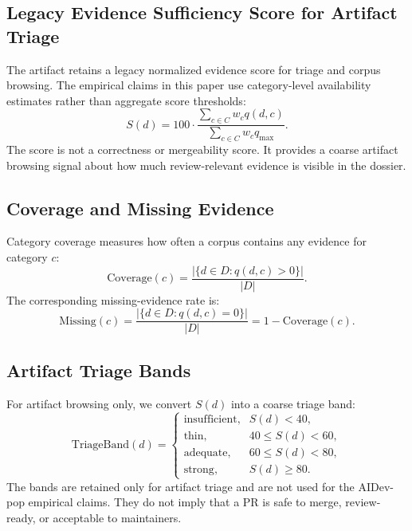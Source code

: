 \documentclass[10pt,conference]{IEEEtran}
\begin{document}
\subsection{Legacy Evidence Sufficiency Score for Artifact Triage}

The artifact retains a legacy normalized evidence score for triage and corpus browsing.
The empirical claims in this paper use category-level availability estimates rather than aggregate score thresholds:
\begin{equation}
S(d)=100 \cdot \frac{\sum_{c \in C} w_c q(d,c)}
{\sum_{c \in C} w_c q_{\max}}.
\end{equation}
The score is not a correctness or mergeability score.
It provides a coarse artifact browsing signal about how much review-relevant evidence is visible in the dossier.

\subsection{Coverage and Missing Evidence}

Category coverage measures how often a corpus contains any evidence for category $c$:
\begin{equation}
\mathrm{Coverage}(c)=
\frac{|\{d \in D : q(d,c)>0\}|}{|D|}.
\end{equation}
The corresponding missing-evidence rate is:
\begin{equation}
\mathrm{Missing}(c)=
\frac{|\{d \in D : q(d,c)=0\}|}{|D|}
=1-\mathrm{Coverage}(c).
\end{equation}

\subsection{Artifact Triage Bands}

For artifact browsing only, we convert $S(d)$ into a coarse triage band:
\begin{equation}
\mathrm{TriageBand}(d)=
\begin{cases}
\text{insufficient}, & S(d)<40,\\
\text{thin}, & 40 \le S(d)<60,\\
\text{adequate}, & 60 \le S(d)<80,\\
\text{strong}, & S(d)\ge 80.
\end{cases}
\end{equation}
The bands are retained only for artifact triage and are not used for the AIDev-pop empirical claims.
They do not imply that a PR is safe to merge, review-ready, or acceptable to maintainers.
\end{document}
